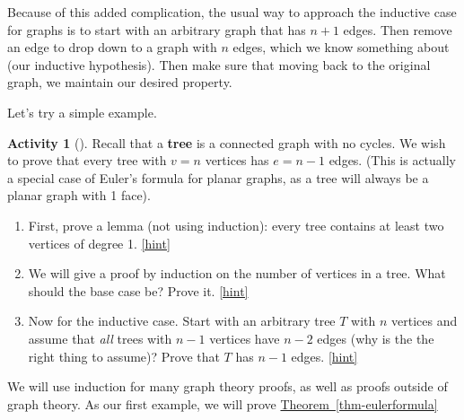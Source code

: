 \documentclass[10pt,]{book}
\newcommand{\terminology}[1]{\textbf{#1}}
\theoremstyle{plain}
\theoremstyle{definition}
\theoremstyle{definition}
\theoremstyle{definition}
\newtheorem{activity}[project]{Activity}
\numberwithin{equation}{chapter}
\begin{document}
\par
\hypertarget{p-238}{}%
Because of this added complication, the usual way to approach the inductive case for graphs is to start with an arbitrary graph that has \(n+1\) edges.  Then remove an edge to drop down to a graph with \(n\) edges, which we know something about (our inductive hypothesis).  Then make sure that moving back to the original graph, we maintain our desired property.%
\par
\hypertarget{p-239}{}%
Let's try a simple example.%
\begin{activity}[]\label{activity-18}
\hypertarget{p-240}{}%
Recall that a \terminology{tree} is a connected graph with no cycles.  We wish to prove that every tree with \(v = n\) vertices has \(e = n-1\) edges.  (This is actually a special case of Euler's formula for planar graphs, as a tree will always be a planar graph with 1 face).%
\begin{enumerate}[font=\bfseries,label=(\alph*),ref=\alph*]
\item\label{task-26} \hypertarget{p-241}{}%
First, prove a lemma (not using induction): every tree contains at least two vertices of degree 1.%
\hfill{\tiny\hyperlink{a-23.a}{[hint]}\hypertarget{q-23.a}{}}\item\label{task-27} \hypertarget{p-243}{}%
We will give a proof by induction on the number of vertices in a tree.  What should the base case be?  Prove it.%
\hfill{\tiny\hyperlink{a-23.b}{[hint]}\hypertarget{q-23.b}{}}\item\label{task-28} \hypertarget{p-245}{}%
Now for the inductive case.  Start with an arbitrary tree \(T\) with \(n\) vertices and assume that \emph{all} trees with \(n-1\) vertices have \(n-2\) edges (why is the the right thing to assume)?  Prove that \(T\) has \(n-1\) edges.%
\hfill{\tiny\hyperlink{a-23.c}{[hint]}\hypertarget{q-23.c}{}}\end{enumerate}
\end{activity}
\hypertarget{p-247}{}%
We will use induction for many graph theory proofs, as well as proofs outside of graph theory.  As our first example, we will prove \hyperref[thm-eulerformula]{Theorem~\ref{thm-eulerformula}}%
\typeout{************************************************}
\typeout{************************************************}
\end{document}
